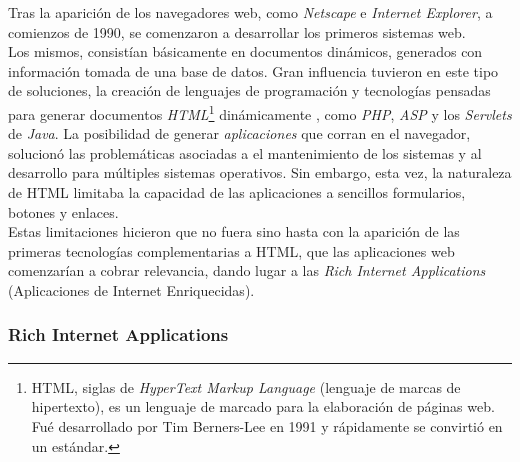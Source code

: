 Tras la aparición de los navegadores web, como \emph{Netscape} e \emph{Internet Explorer},
a comienzos de 1990, se comenzaron a desarrollar los primeros sistemas web.\\
Los mismos, consistían básicamente en documentos dinámicos, generados con información
tomada de una base de datos. Gran influencia tuvieron en este tipo de soluciones, la
creación de lenguajes de programación y tecnologías pensadas para generar documentos
\emph{HTML}\footnote{
	HTML, siglas de \emph{HyperText Markup Language} (lenguaje de marcas de hipertexto), es
	un lenguaje de marcado para la elaboración de páginas web. Fué desarrollado por Tim
	Berners-Lee en 1991 y rápidamente se convirtió en un estándar.
} dinámicamente , como \emph{PHP}, \emph{ASP} y los
\emph{Servlets} de \emph{Java}.
La posibilidad de generar \emph{aplicaciones} que corran en el navegador, solucionó las
problemáticas asociadas a el mantenimiento de los sistemas y al desarrollo para múltiples
sistemas operativos. Sin embargo, esta vez, la naturaleza de HTML limitaba la capacidad
de las aplicaciones a sencillos formularios, botones y enlaces.\\
Estas limitaciones hicieron que no fuera sino hasta con la aparición de las primeras
tecnologías complementarias a HTML, que las aplicaciones web comenzarían a cobrar
relevancia, dando lugar a las \emph{Rich Internet Applications} (Aplicaciones de
Internet Enriquecidas).

\subsubsection{Rich Internet Applications}
\label{subsubsec:intro:about_web:rias}

